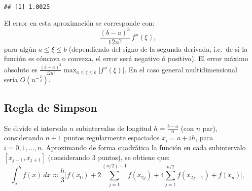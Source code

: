 \documentclass[
]{book}
\theoremstyle{break}
\theoremstyle{definition}
\theoremstyle{definition}
\theoremstyle{definition}
\theoremstyle{remark}
\begin{document}
\begin{verbatim}
## [1] 1.0025
\end{verbatim}

El error en esta aproximación se corresponde con:
\[ \frac{(b-a)^3}{12n^2}\,f''(\xi), \]
para algún \(a\leq \xi \leq b\) (dependiendo del signo de la segunda derivada,
i.e.~de si la función es cóncava o convexa, el error será negativo ó positivo). El error
máximo absoluto es \(\frac{(b-a)^3}{12n^2}\max_{a\leq \xi \leq b}\left|f''(\xi)\right|\).
En el caso general multidimensional sería \(O(n^{-\frac{2}{d}})\).

\hypertarget{regla-de-simpson}{%
\subsection{Regla de Simpson}\label{regla-de-simpson}}

Se divide el intervalo \(n\) subintervalos de longitud \(h= \frac{b-a}{n}\) (con \(n\) par),
considerando \(n + 1\) puntos regularmente espaciados \(x_i = a + ih\), para \(i = 0, 1, ..., n\).
Aproximando de forma cuadrática la función en cada subintervalo \([x_{j-1},x_{j+1}]\)
(considerando 3 puntos), se obtiene que:
\[ \int_a^b f(x) \, dx \approx \frac{h}{3} \bigg[ 
f(x_0)+2\sum_{j=1}^{(n/2)-1}f(x_{2j})+ 4\sum_{j=1}^{n/2}f(x_{2j-1})+f(x_n) \bigg],\]
\end{document}
